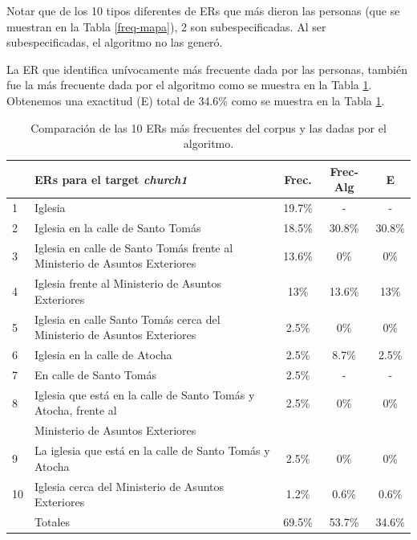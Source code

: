 Notar que de los 10 tipos diferentes de ERs que m\'as dieron las personas (que se muestran en la Tabla \ref{freq-mapa}), 
2 son subespecificadas. Al ser subespecificadas, el algoritmo no las gener\'o. 

La ER que identifica un\'ivocamente m\'as frecuente dada por las personas, tambi\'en fue la m\'as frecuente dada por el algoritmo como se muestra en la Tabla \ref{compara-corpus-alg}. Obtenemos una exactitud (E) total de 34.6\% como se muestra en la Tabla \ref{compara-corpus-alg}.

\begin{table}[H]
{\footnotesize
\begin{center}
\begin{tabular}{|l|l|c|c|c|}
\hline
&ERs para el target {\it church1} 					      &  Frec. & Frec-Alg &E\\ \hline \hline
1&Iglesia 								 &19.7\%  &  -&-\\ \hline
2&Iglesia en la calle de Santo Tom\'as						 &18.5\% 	& 30.8\%  &30.8\% \\ \hline
3&Iglesia en calle de Santo Tom\'as frente al Ministerio de Asuntos Exteriores        &13.6\% & 0\%& 0\% \\ \hline
4&Iglesia frente al Ministerio de Asuntos Exteriores 			 &13\% & 13.6\% & 13\% \\ \hline
5&Iglesia en calle Santo Tom\'as cerca del Ministerio de Asuntos Exteriores        &2.5\% & 0\% & 0\% \\ \hline
6&Iglesia en la calle de Atocha							&2.5\%  &8.7\% & 2.5\% \\ \hline
7&En calle de Santo Tom\'as 							&2.5\% 	& -  &-\\ \hline
8&Iglesia que est\'a en la calle de Santo Tom\'as y Atocha, frente al 	 &2.5\%	& 0\% &0\% \\ 
&Ministerio de Asuntos Exteriores						 && &\\ \hline
9&La iglesia que est\'a en la calle de Santo Tom\'as y Atocha			 &2.5\% 	& 0\%&  0\% \\ \hline
10&Iglesia cerca del Ministerio de Asuntos Exteriores				 &1.2\% 	&0.6\% & 0.6\% \\ \hline \hline

&Totales &69.5\%&53.7\%&34.6\% \\ \hline
\end{tabular}
\caption{Comparaci\'on de las 10 ERs m\'as frecuentes del corpus y las dadas por el algoritmo.}\label{compara-corpus-alg}
\end{center}
}
\end{table}


